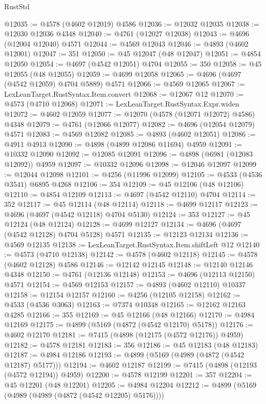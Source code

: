 \begin{lexlean}{RustStd}
\begin{coremodule}
@12035 := @4578 (@4602 @12019) @4586
@12036 := @12032 @12035
@12038 := @12030 @12036 @4348
@12040 := @4761 (@12027 @12038)
@12043 := @4696 (@12004 @12040) @4571
@12044 := @4569 @12043
@12046 := @4893 (@4602 @12001)
@12047 := 351
@12050 := @45 @12047 (@48 @12047)
@12051 := @4854 @12050
@12054 := @4697 (@4542 @12051) @4704
@12055 := 350
@12058 := @45 @12055 (@48 @12055)
@12059 := @4699 @12058
@12065 := @4696 (@4697 (@4542 @12059) @4704 @5889) @4571
@12066 := @4569 @12065
@12067 := LexLeanTarget.RustSyntax.Item.convert
@12068 := @12067 @12
@12070 := @4573 (@4710 @12068)
@12071 := LexLeanTarget.RustSyntax.Expr.widen
@12072 := @4602 @12059
@12077 := @12070 (@4578 (@12071 @12072) @4586) @4348
@12079 := @4761 (@12066 @12077)
@12082 := @4696 (@12054 @12079) @4571
@12083 := @4569 @12082
@12085 := @4893 (@4602 @12051)
@12086 := @4911 @4913
@12090 := @4898 (@4899 @12086 @11694) @4959
@12091 := @10332 @12090
@12092 := @12085 @12091
@12096 := @4898 (@6981 (@12083 @12092)) @4959
@12097 := @10332 @12096
@12098 := @12046 @12097
@12099 := @12044 @12098
@12101 := @4256 (@11996 @12099)
@12105 := @4533 (@4536 @3541) @6895 @4268
@12106 := 354
@12109 := @45 @12106 (@48 @12106)
@12110 := @4854 @12109
@12113 := @4697 (@4542 @12110) @4704
@12114 := 352
@12117 := @45 @12114 (@48 @12114)
@12118 := @4699 @12117
@12123 := @4696 (@4697 (@4542 @12118) @4704 @5130)
@12124 := 353
@12127 := @45 @12124 (@48 @12124)
@12128 := @4699 @12127
@12134 := @4696 (@4697 (@4542 @12128) @4704 @5128) @4571
@12135 := @12123 @12134
@12136 := @4569 @12135
@12138 := LexLeanTarget.RustSyntax.Item.shiftLeft @12
@12140 := @4573 (@4710 @12138)
@12142 := @4578 (@4602 @12118)
@12145 := @4578 (@4602 @12128) @4586
@12146 := @12142 @12145
@12148 := @12140 @12146 @4348
@12150 := @4761 (@12136 @12148)
@12153 := @4696 (@12113 @12150) @4571
@12154 := @4569 @12153
@12157 := @4893 (@4602 @12110) @10337
@12158 := @12154 @12157
@12160 := @4256 (@12105 @12158)
@12162 := @4533 (@4536 @3063)
@12163 := @7374 @10348
@12165 := @12162 @12163 @4285
@12166 := 355
@12169 := @45 @12166 (@48 @12166)
@12170 := @4984 @12169
@12175 := @4899 (@5169 (@4872 (@4542 @12170) @5178))
@12176 := @4602 @12170
@12181 := @7415 (@4898 (@12175 (@4572 @12176)) @4959)
@12182 := @4578 @12181
@12183 := 356
@12186 := @45 @12183 (@48 @12183)
@12187 := @4984 @12186
@12193 := @4899 (@5169 (@4989 (@4872 (@4542 @12187) @5177)))
@12194 := @4602 @12187
@12199 := @7415 (@4898 (@12193 (@4572 @12194)) @4959)
@12200 := @4578 @12199
@12201 := 357
@12204 := @45 @12201 (@48 @12201)
@12205 := @4984 @12204
@12212 := @4899 (@5169 (@4989 (@4989 (@4872 (@4542 @12205) @5176))))

\end{coremodule}
\end{lexlean}
